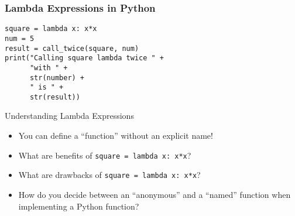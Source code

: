 \documentclass[14pt,aspectratio=169]{beamer}
\begin{document}
%
\begin{frame}[fragile]
  \frametitle{Lambda Expressions in Python}
  \hspace*{-.1in}
  \begin{minipage}{6in}
    \begin{verbatim}
square = lambda x: x*x
num = 5
result = call_twice(square, num)
print("Calling square lambda twice " +
      "with " +
      str(number) +
      " is " +
      str(result))
    \end{verbatim}
  \end{minipage}
  \vspace*{.05in}
\end{frame}

%
\begin{frame}{Understanding Lambda Expressions}
  \begin{itemize}
    \item You can define a ``function'' without an explicit name!
      \vspace*{-.2in}
    \item What are benefits of {\tt square = lambda x: x*x}?
      \vspace*{-.2in}
    \item What are drawbacks of {\tt square = lambda x: x*x}?
      \vspace*{-.2in}
    \item How do you decide between an ``anonymous'' and a ``named'' function
      when implementing a Python function?
      \vspace*{-.2in}
  \end{itemize}
\end{frame}
\end{document}
